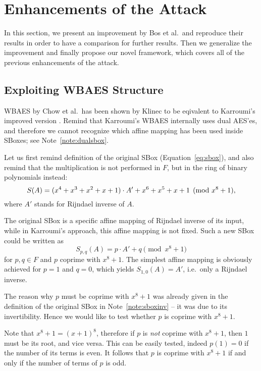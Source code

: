 \section{Enhancements of the Attack}   %
\label{sec:enhancements}

In this section, we present an improvement by Bos et al.\ and reproduce their results in order to have a comparison for further results. Then we generalize the improvement and finally propose our novel framework, which covers all of the previous enhancements of the attack.



\subsection{Exploiting WBAES Structure}

WBAES by Chow et al.\ has been shown by Klinec \cite{klinec2013white} to be eqivalent to Karroumi's improved version \cite{karroumi2010protecting}. Remind that Karroumi's WBAES internally uses dual AES'es, and therefore we cannot recognize which affine mapping has been used inside SBoxes; see Note~\ref{note:dualsbox}.

Let us first remind definition of the original SBox (Equation~\ref{eq:sbox}), and also remind that the multiplication is not performed in $F$, but in the ring of binary polynomials instead:
\[
	S(A) = (x^4 + x^3 + x^2 + x + 1) \cdot A' + x^6 + x^5 + x + 1 \pmod{x^8+1} ,
\]
where $A'$ stands for Rijndael inverse of $A$.

The original SBox is a specific affine mapping of Rijndael inverse of its input, while in Karroumi's approach, this affine mapping is not fixed. Such a new SBox could be written as   %
\begin{equation}
\label{eq:spq}
	S_{p,q}(A) = p\cdot A' + q \pmod{x^8+1}
\end{equation}
for $p,q\in F$ and $p$ coprime with $x^8+1$. The simplest affine mapping is obviously achieved for $p=1$ and $q=0$, which yields $S_{1,0}(A) = A'$, i.e.\ only a Rijndael inverse.

\begin{remark}
\label{rem:coprime}
	The reason why $p$ must be coprime with $x^8+1$ was already given in the definition of the original SBox in Note~\ref{note:sboxinv} -- it was due to its invertibility. Hence we would like to test whether $p$ is coprime with $x^8+1$.
	
	Note that $x^8+1 = (x+1)^8$, therefore if $p$ is {\em not} coprime with $x^8+1$, then $1$ must be its root, and vice versa. This can be easily tested, indeed $p(1) = 0$ if the number of its terms is even. It follows that $p$ is coprime with $x^8+1$ if and only if the number of terms of $p$ is odd.
\end{remark}


